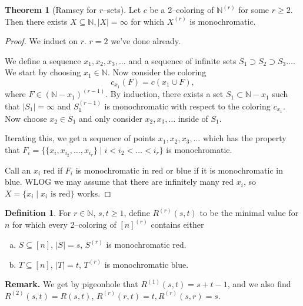 \documentclass{article}
\theoremstyle{definition}
\newtheorem{theorem}{Theorem}[section]
\newtheorem{defn}{Definition}[section]
\begin{document}
\begin{theorem}[Ramsey for $r$--sets]
    Let $c$ be a 2--coloring of $\mathbb{N}^{(r)}$ for some $r\ge 2.$ Then there exists $X \subseteq \mathbb{N}, |X|=\infty$ for which $X^{(r)}$ is monochromatic.
\end{theorem}
\begin{proof}
    We induct on $r$. $r=2$ we've done already.
    \vspace{1mm}
    
    We define a sequence $x_1,x_2,x_3,\ldots$ and a sequence of infinite sets $S_1 \supset S_2 \supset S_3 \ldots$. We start by choosing $x_1 \in \mathbb{N}$. Now consider the coloring \[
    c_{x_1}(F)=c(x_1 \cup F),
    \] where $F \in (\mathbb{N}-x_1)^{(r-1)}$. By induction, there exists a set $S_1 \subset \mathbb{N}-x_1$ such that $|S_1|=\infty$ and $S_1^{(r-1)}$ is monochromatic with respect to the coloring $c_{x_1}$. Now choose $x_2 \in S_1$ and only consider $x_2,x_3,\ldots$ inside of $S_1$.

    Iterating this, we get a sequence of points $x_1,x_2,x_3,\ldots$ which has the property that $F_i = \{\{x_{i},x_{i_2},\ldots,x_{i_r}\} \mid i < i_2 < \ldots < i_r\}$ is monochromatic.

    Call an $x_i$ red if $F_i$ is monochromatic in red or blue if it is monochromatic in blue. WLOG we may assume that there are infinitely many red $x_i$, so $X = \{x_i \mid x_i \text{ is red}\}$ works.
\end{proof}
\begin{defn}
    For $r \in \mathbb{N}$, $s,t \ge 1$, define $R^{(r)}(s,t)$ to be the minimal value for $n$ for which every 2--coloring of $[n]^{(r)}$ contains either 
    \begin{enumerate}[(a)]
        \item $S \subseteq [n]$, $|S|=s$, $S^{(r)}$ is monochromatic red.
        \item $T \subseteq [n]$, $|T|=t$, $T^{(r)}$ is monochromatic blue.
    \end{enumerate}
\end{defn}
\textbf{Remark.} We get by pigeonhole that $R^{(1)}(s,t)=s+t-1$, and we also find $R^{(2)}(s,t)=R(s,t)$, $R^{(r)}(r,t)=t, R^{(r)}(s,r)=s$.
\end{document}
